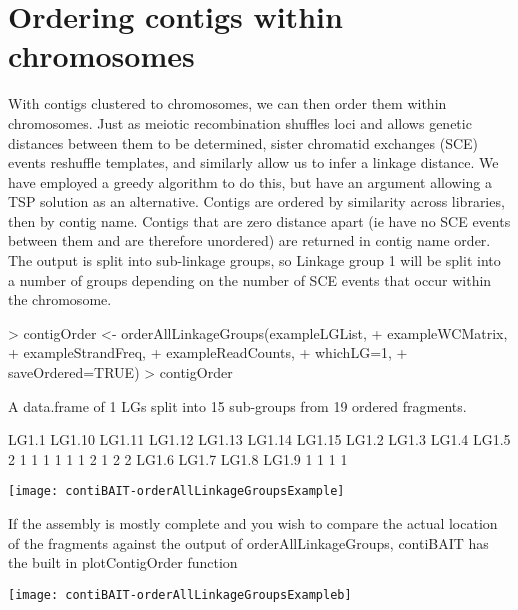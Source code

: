 \documentclass{article}
\begin{document}
\section{Ordering contigs within chromosomes}

With contigs clustered to chromosomes, we can then order them within chromosomes. Just as meiotic recombination shuffles loci and allows genetic distances between them to be determined, sister chromatid exchanges (SCE) events reshuffle templates, and similarly allow us to infer a linkage distance. We have employed a greedy algorithm to do this, but have an argument allowing a TSP solution as an alternative. Contigs are ordered by similarity across libraries, then by contig name. Contigs that are zero distance apart (ie have no SCE events between them and are therefore unordered) are returned in contig name order. The output is split into sub-linkage groups, so Linkage group 1 will be split into a number of groups depending on the number of SCE events that occur within the chromosome.

\begin{Schunk}
\begin{Sinput}
> contigOrder <- orderAllLinkageGroups(exampleLGList,
+ exampleWCMatrix,
+ exampleStrandFreq,
+ exampleReadCounts,
+ whichLG=1,
+ saveOrdered=TRUE)
> contigOrder
\end{Sinput}
\begin{Soutput}
A data.frame of 1 LGs split into 15 sub-groups from 19 ordered fragments.

 LG1.1 LG1.10 LG1.11 LG1.12 LG1.13 LG1.14 LG1.15  LG1.2  LG1.3  LG1.4  LG1.5 
     2      1      1      1      1      1      1      2      1      2      2 
 LG1.6  LG1.7  LG1.8  LG1.9 
     1      1      1      1 
\end{Soutput}
\end{Schunk}
\texttt{[image: contiBAIT-orderAllLinkageGroupsExample]}

If the assembly is mostly complete and you wish to compare the actual location of the fragments against the output of orderAllLinkageGroups, contiBAIT has the built in plotContigOrder function 

\begin{Schunk}
\end{Schunk}
\texttt{[image: contiBAIT-orderAllLinkageGroupsExampleb]}
\end{document}
